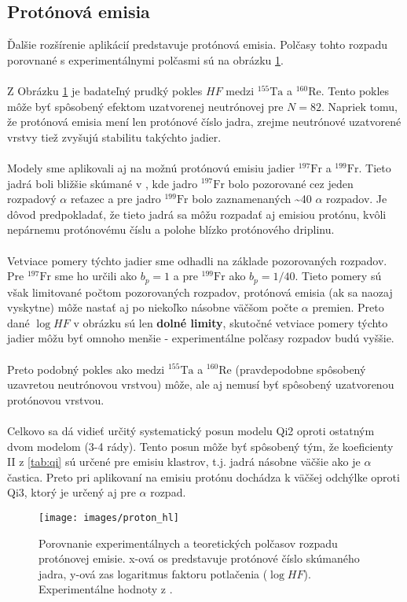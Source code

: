 \documentclass[12pt, oneside]{book}
\begin{document}
\subsection{Protónová emisia}
Ďalšie rozšírenie aplikácií predstavuje protónová emisia. Polčasy tohto rozpadu porovnané s experimentálnymi polčasmi sú na obrázku \ref{fig:proton_hl}.
\\
\\
Z Obrázku \ref{fig:proton_hl} je badateľný prudký pokles $HF$ medzi $^{155} \mathrm{Ta}$ a $^{160} \mathrm{Re}$. Tento pokles môže byť spôsobený efektom uzatvorenej neutrónovej pre $N=82$. Napriek tomu, že protónová emisia mení len protónové číslo jadra, zrejme neutrónové uzatvorené vrstvy tiež zvyšujú stabilitu takýchto jadier.
\\
\\
Modely sme aplikovali aj na možnú protónovú emisiu jadier $^{197} \mathrm{Fr}$ a $^{199}\mathrm{Fr}$. Tieto jadrá boli bližšie skúmané v \cite{kalaninova}, kde jadro $^{197} \mathrm{Fr}$ bolo pozorované cez jeden rozpadový $\alpha$ reťazec a pre jadro $^{199}\mathrm{Fr}$ bolo zaznamenaných \sim 40 $\alpha$ rozpadov. Je dôvod predpokladať, že tieto jadrá sa môžu rozpadať aj emisiou protónu, kvôli nepárnemu protónovému číslu a polohe blízko protónového driplinu.
\\
\\
Vetviace pomery týchto jadier sme odhadli na základe pozorovaných rozpadov. Pre $^{197}\mathrm{Fr}$ sme ho určili ako $b_p=1$ a pre $^{199}\mathrm{Fr}$ ako $b_p=1/40$. Tieto pomery sú však limitované počtom pozorovaných rozpadov, protónová emisia (ak sa naozaj vyskytne) môže nastať aj po niekoľko násobne väčšom počte $\alpha$ premien. Preto dané $\log HF$ v obrázku sú len \textbf{dolné limity}, skutočné vetviace pomery týchto jadier môžu byť omnoho menšie - experimentálne polčasy rozpadov budú vyššie.
\\
\\
Preto podobný pokles ako medzi $^{155} \mathrm{Ta}$ a $^{160} \mathrm{Re}$ (pravdepodobne spôsobený uzavretou neutrónovou vrstvou) môže, ale aj nemusí byť spôsobený uzatvorenou protónovou vrstvou.
\\
\\
Celkovo sa dá vidieť určitý systematický posun modelu Qi2 oproti ostatným dvom modelom (3-4 rády). Tento posun môže byť spôsobený tým, že koeficienty II z \ref{tab:qi} sú určené pre emisiu klastrov, t.j. jadrá  násobne väčšie ako je $\alpha$ častica. Preto pri aplikovaní na emisiu protónu dochádza k väčšej odchýlke oproti Qi3, ktorý je určený aj pre $\alpha$ rozpad.
\vspace{6mm}
\begin{figure}[h!]
    	\begin{center}
	\texttt{[image: images/proton\_hl]}
	\caption{Porovnanie experimentálnych a teoretických polčasov rozpadu protónovej emisie. x-ová os predstavuje protónové číslo skúmaného jadra, y-ová zas logaritmus faktoru potlačenia ($\log{HF}$). Experimentálne hodnoty z \cite{audi2012ame2012}.}
	\label{fig:proton_hl}
    \end{center}
\end{figure}
\end{document}
